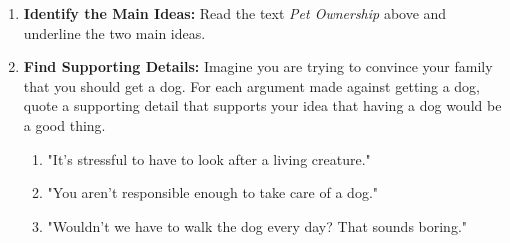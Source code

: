 \documentclass[12pt]{article}
\begin{document}
\begin{tcolorbox}[colframe=black!60, colback=white, 
coltitle=black, colbacktitle=black!15, fonttitle=\bfseries\Large, 
title=Guided Practice, halign title=center, left=10pt, right=10pt, top=10pt, bottom=15pt]

\vspace{0.5cm}

\begin{enumerate}[itemsep=1em] %
    \item \textbf{Identify the Main Ideas:} Read the text \textit{Pet Ownership} above and underline the two main ideas.
    \item \textbf{Find Supporting Details:} Imagine you are trying to convince your family that you should get a dog. For each argument made against getting a dog, quote a supporting detail that supports your idea that having a dog would be a good thing.
        \begin{enumerate}
            \item "It's stressful to have to look after a living creature."
\vspace{2cm}

\item "You aren't responsible enough to take care of a dog."
\vspace{2cm}
\item "Wouldn't we have to walk the dog every day? That sounds boring."
\vspace{2cm}
        \end{enumerate}

      
\end{enumerate}

\end{tcolorbox}
\end{document}
